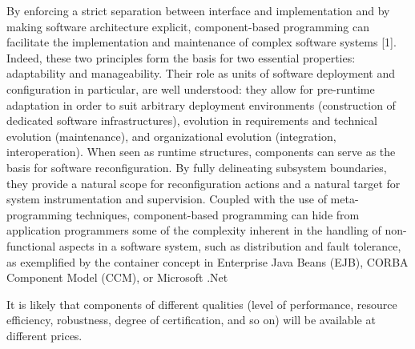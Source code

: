 By enforcing a strict separation between interface and implementation and by making software
architecture explicit, component-based programming can facilitate the implementation and
maintenance of complex software systems [1]. Indeed, these two principles form the basis for two
essential properties: adaptability and manageability. Their role as units of software deployment and
configuration in particular, are well understood: they allow for pre-runtime adaptation in order to
suit arbitrary deployment environments (construction of dedicated software infrastructures), evolution
in requirements and technical evolution (maintenance), and organizational evolution (integration,
interoperation). When seen as runtime structures, components can serve as the basis for software
reconfiguration. By fully delineating subsystem boundaries, they provide a natural scope for
reconfiguration actions and a natural target for system instrumentation and supervision. Coupled with
the use of meta-programming techniques, component-based programming can hide from application
programmers some of the complexity inherent in the handling of non-functional aspects in a software
system, such as distribution and fault tolerance, as exemplified by the container concept in Enterprise
Java Beans (EJB), CORBA Component Model (CCM), or Microsoft .Net

It is likely that components of different qualities (level of performance, resource efficiency,
robustness, degree of certification, and so on) will be available at different
prices.

